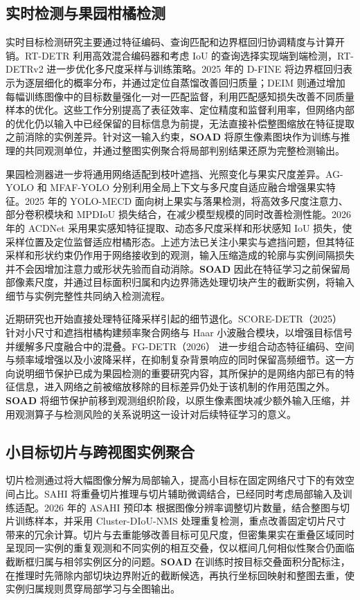 \documentclass[11pt,a4paper]{ctexart}
\begin{document}
\subsection{实时检测与果园柑橘检测}
实时目标检测研究主要通过特征编码、查询匹配和边界框回归协调精度与计算开销。RT-DETR \cite{rtdetr} 利用高效混合编码器和考虑 IoU 的查询选择实现端到端检测，RT-DETRv2 \cite{rtdetrv2} 进一步优化多尺度采样与训练策略。2025 年的 D-FINE \cite{dfine} 将边界框回归表示为逐层细化的概率分布，并通过定位自蒸馏改善回归质量；DEIM \cite{deim} 则通过增加每幅训练图像中的目标数量强化一对一匹配监督，利用匹配感知损失改善不同质量样本的优化。这些工作分别提高了表征效率、定位精度和监督利用率，但网络内部的优化仍以输入中已经保留的目标信息为前提，无法直接补偿整图缩放在特征提取之前消除的实例差异。针对这一输入约束，\textbf{SOAD} 将原生像素图块作为训练与推理的共同观测单位，并通过整图实例聚合将局部判别结果还原为完整检测输出。

果园检测器进一步将通用网络适配到枝叶遮挡、光照变化与果实尺度差异。AG-YOLO \cite{agyolo} 和 MFAF-YOLO \cite{mfaf} 分别利用全局上下文与多尺度自适应融合增强果实特征。2025 年的 YOLO-MECD \cite{mecd} 面向树上果实与落果检测，将高效多尺度注意力、部分卷积模块和 MPDIoU 损失结合，在减少模型规模的同时改善检测性能。2026 年的 ACDNet \cite{acdnet} 采用果实感知特征提取、动态多尺度采样和形状感知 IoU 损失，使采样位置及定位监督适应柑橘形态。上述方法已关注小果实与遮挡问题，但其特征采样和形状约束仍作用于网络接收到的观测，输入压缩造成的轮廓与实例间隔损失并不会因增加注意力或形状先验而自动消除。\textbf{SOAD} 因此在特征学习之前保留局部像素尺度，并通过目标面积归属和内边界筛选处理切块产生的截断实例，将输入细节与实例完整性共同纳入检测流程。

近期研究也开始直接处理特征降采样引起的细节退化。SCORE-DETR（2025）\cite{scoredetr} 针对小尺寸和遮挡柑橘构建频率聚合网络与 Haar 小波融合模块，以增强目标信号并缓解多尺度融合中的混叠。FG-DETR（2026）\cite{fgdetr} 进一步组合动态特征编码、空间与频率域增强以及小波降采样，在抑制复杂背景响应的同时保留高频细节。这一方向说明细节保护已成为果园检测的重要研究内容，其所保护的是网络内部已有的特征信息，进入网络之前被缩放移除的目标差异仍处于该机制的作用范围之外。\textbf{SOAD} 将细节保护前移到观测组织阶段，以原生像素图块减少额外输入压缩，并用观测算子与检测风险的关系说明这一设计对后续特征学习的意义。

\subsection{小目标切片与跨视图实例聚合}
切片检测通过将大幅图像分解为局部输入，提高小目标在固定网络尺寸下的有效空间占比。SAHI \cite{sahi} 将重叠切片推理与切片辅助微调结合，已经同时考虑局部输入及训练适配。2026 年的 ASAHI 预印本 \cite{asahi} 根据图像分辨率调整切片数量，结合整图与切片训练样本，并采用 Cluster-DIoU-NMS 处理重复检测，重点改善固定切片尺寸带来的冗余计算。切片与去重能够改善目标可见尺度，但密集果实在重叠区域同时呈现同一实例的重复观测和不同实例的相互交叠，仅以框间几何相似性聚合仍面临截断框归属与相邻实例区分的问题。\textbf{SOAD} 在训练时按目标交叠面积分配标注，在推理时先筛除内部切块边界附近的截断候选，再执行坐标回映射和整图去重，使实例归属规则贯穿局部学习与全图输出。
\end{document}

